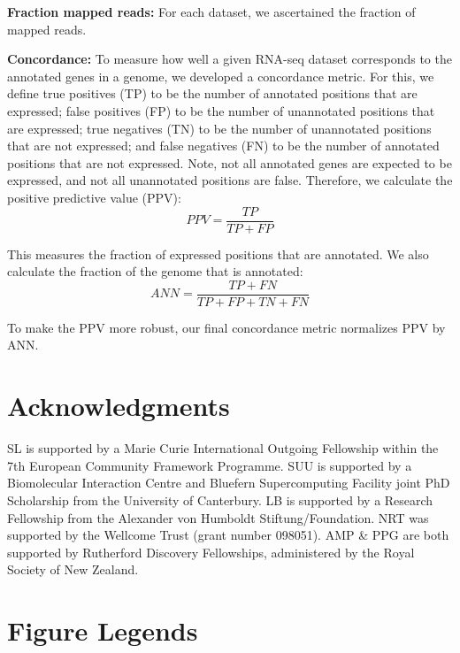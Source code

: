 \documentclass[10pt]{article}
\begin{document}
{\bf Fraction mapped reads:} For each dataset, we ascertained the
fraction of mapped reads.
	
{\bf Concordance:} To measure how well a given RNA-seq dataset
corresponds to the annotated genes in a genome, we developed a
concordance metric. For this, we define true positives (TP) to be the
number of annotated positions that are expressed; false positives (FP)
to be the number of unannotated positions that are expressed; true
negatives (TN) to be the number of unannotated positions that are not
expressed; and false negatives (FN) to be the number of annotated
positions that are not expressed. Note, not all annotated genes are
expected to be expressed, and not all unannotated positions are
false. Therefore, we calculate the positive predictive value (PPV):
\[
PPV=\frac{TP}{TP+FP}
\]
	
This measures the fraction of expressed positions that are
annotated. We also calculate the fraction of the genome that is
annotated:
\[
ANN=\frac{TP+FN}{TP+FP+TN+FN}
\]

To make the PPV more robust, our final concordance metric normalizes
PPV by ANN.

\section*{Acknowledgments}

SL is supported by a Marie Curie International Outgoing Fellowship
within the 7th European Community Framework Programme. SUU is
supported by a Biomolecular Interaction Centre and Bluefern
Supercomputing Facility joint PhD Scholarship from the University of
Canterbury. LB is supported by a Research Fellowship from the
Alexander von Humboldt Stiftung/Foundation. NRT was supported by the
Wellcome Trust (grant number 098051). AMP \& PPG are both supported by
Rutherford Discovery Fellowships, administered by the Royal Society of
New Zealand.



\section*{Figure Legends}
\end{document}
